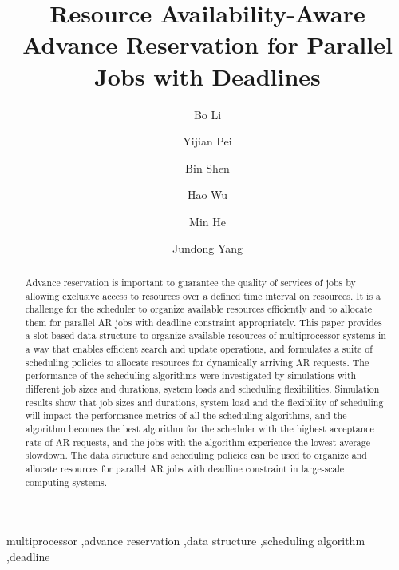 \documentclass[preprint,12pt]{elsarticle}
\begin{document}
\begin{frontmatter}


\title{Resource Availability-Aware Advance Reservation for Parallel Jobs with Deadlines}

\author[ynu]{Bo Li}
\author[ynu]{Yijian Pei}
\author[whut]{Bin Shen}
\author[ynu]{Hao Wu}
\author[ynu]{Min He}
\author[ynu]{Jundong Yang}



\address[ynu]{School of Information Science and Engineering, Yunnan University, Kunming 650091, China}
\address[whut]{School of Electrical and Information Engineering, Wuhan Institute of Technology, Wuhan 430073, China}



\begin{abstract}
Advance reservation is important to guarantee the quality of services of jobs by allowing exclusive access to resources over a defined time interval on resources. It is a challenge for the scheduler to organize available resources efficiently and to allocate them for parallel AR jobs with deadline constraint appropriately. This paper provides a slot-based data structure to organize available resources of multiprocessor systems in a way that enables efficient search and update operations, and formulates a suite of scheduling policies to allocate resources for dynamically arriving AR requests. The performance of the scheduling algorithms were investigated by simulations with different job sizes and durations, system loads and scheduling flexibilities. Simulation results show that job sizes and durations, system load and the flexibility of scheduling will impact the performance metrics of all the scheduling algorithms, and the  algorithm becomes the best algorithm for the scheduler with the highest acceptance rate of AR requests, and the jobs with the  algorithm experience the lowest average slowdown. The data structure and scheduling policies can be used to organize and allocate resources for parallel AR jobs with deadline constraint in large-scale computing systems.
\end{abstract}


\begin{keyword}


multiprocessor \sep advance reservation \sep data structure  \sep scheduling algorithm \sep deadline



\end{keyword}

\end{frontmatter}
\end{document}
